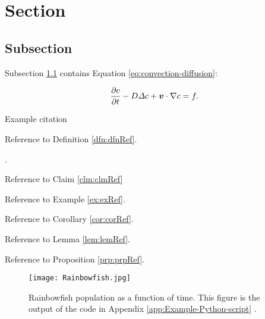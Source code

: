 \section{Section}\label{sse:Section}

\subsection{Subsection}\label{sss:Subsection}

Subsection \ref{sss:Subsection} contains Equation \eqref{eq:convection-diffusion}:

\begin{equation}\label{eq:convection-diffusion}
    \frac{\p c}{\p t} - D \Delta c + \mathbfit{v}\cdot\nabla c = f.
\end{equation}

Example citation \citep{baarslag2015learning}


Reference to Definition \ref{dfn:dfnRef}.


.


Reference to Claim \ref{clm:clmRef}


Reference to Example \ref{ex:exRef}.




Reference to Corollary \ref{cor:corRef}.


Reference to Lemma \ref{lem:lemRef}.


Reference to Proposition \ref{prp:prpRef}.

\begin{figure}[H]
    \centering
    \texttt{[image: Rainbowfish.jpg]}
    \caption[Rainbowfish population as a function of time]{Rainbowfish population as a function of time.
        This figure is the output of the code in Appendix \ref{app:Example-Python-script} \citep{tudelftopencourseware}.}
    \label{fig:Rainbowfish}
\end{figure}
